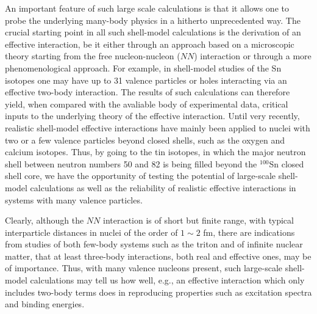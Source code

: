 An important feature of such large scale calculations
is that it allows one to probe the underlying many-body
physics in a hitherto unprecedented way.
The crucial starting point in all such shell-model 
calculations is
the derivation of an effective interaction, be it
either through an approach based on a microscopic theory
starting from the free nucleon-nucleon ($NN$) interaction 
or through a more phenomenological approach.  For example, in
shell-model studies of the Sn isotopes one may have up to 31 valence
particles or holes interacting via an effective two-body
interaction. The results of such calculations can therefore yield,
when compared with the avaliable body of experimental data, critical
inputs to the underlying theory of the effective interaction.  Until
very recently, realistic shell-model effective interactions have
mainly been applied to nuclei with two or a few valence particles
beyond closed shells, such as the oxygen and calcium isotopes. Thus,
by going to the tin isotopes, in which the major neutron shell between
neutron numbers 50 and 82 is being filled beyond the $^{100}$Sn 
closed
shell core, we have the opportunity of testing the potential of
large-scale shell-model calculations as well as the reliability of
realistic effective interactions in systems with many valence
particles.

Clearly, although the $NN$ interaction is of short
but finite range, with typical interparticle
distances in nuclei of the order of $1\sim 2$ fm, there are  
indications from studies of both few-body systems such as the triton and
of infinite nuclear matter, that at least three-body
interactions, both real and effective ones, may be of
importance. 
Thus, with many valence nucleons present, such
large-scale shell-model calculations may
tell us how well, e.g., an effective interaction 
which only includes two-body terms does in
reproducing properties such as excitation spectra and
binding energies. 


